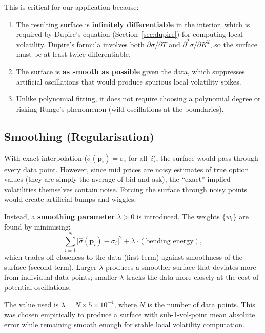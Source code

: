 \documentclass[12pt, a4paper]{article}
\begin{document}
This is critical for our application because:
\begin{enumerate}[nosep]
    \item The resulting surface is \textbf{infinitely differentiable} in the
          interior, which is required by Dupire's equation
          (Section~\ref{sec:dupire}) for computing local volatility. Dupire's
          formula involves both $\partial\sigma/\partial T$ and
          $\partial^2\sigma/\partial K^2$, so the surface must be at least
          twice differentiable.
    \item The surface is \textbf{as smooth as possible} given the data, which
          suppresses artificial oscillations that would produce spurious local
          volatility spikes.
    \item Unlike polynomial fitting, it does not require choosing a polynomial
          degree or risking Runge's phenomenon (wild oscillations at the
          boundaries).
\end{enumerate}

\subsection{Smoothing (Regularisation)}
\label{sec:smoothing}

With exact interpolation ($\hat{\sigma}(\mathbf{p}_i) = \sigma_i$ for all~$i$),
the surface would pass through every data point. However, since mid prices are
noisy estimates of true option values (they are simply the average of bid and
ask), the ``exact'' implied volatilities themselves contain noise. Forcing the
surface through noisy points would create artificial bumps and wiggles.

Instead, a \textbf{smoothing parameter} $\lambda > 0$ is introduced. The
weights $\{w_i\}$ are found by minimising:
\begin{equation}
    \sum_{i=1}^{N} \big[\hat{\sigma}(\mathbf{p}_i) - \sigma_i\big]^2
    + \lambda \cdot (\text{bending energy}),
    \label{eq:smoothing}
\end{equation}
which trades off closeness to the data (first term) against smoothness of the
surface (second term). Larger $\lambda$ produces a smoother surface that deviates
more from individual data points; smaller $\lambda$ tracks the data more closely
at the cost of potential oscillations.

The value used is $\lambda = N \times 5 \times 10^{-4}$, where $N$ is the
number of data points. This was chosen empirically to produce a surface with
sub-1-vol-point mean absolute error while remaining smooth enough for stable
local volatility computation.
\end{document}
